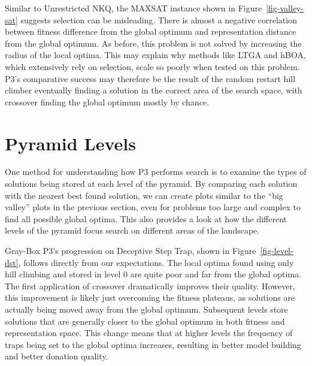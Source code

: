 Similar to Unrestricted NKQ, the MAXSAT instance shown in Figure~\ref{fig-valley-sat} suggests selection can be misleading.
There is almost a negative correlation between fitness difference from the global optimum and representation distance from the
global optimum. As before, this problem is not solved by increasing the radius of the local optima.
This may explain why methods like LTGA and hBOA, which extensively rely on selection,
scale so poorly when tested on this problem. P3's comparative success may therefore be the result of the random restart hill climber
eventually finding a solution in the correct area of the search space, with crossover finding the global optimum mostly by chance.

\section{Pyramid Levels}
One method for understanding how P3 performs search is to examine the types of solutions being stored at each level
of the pyramid. By comparing each solution with the nearest best found solution, we can create plots similar to the ``big valley''
plots 
in the previous section, even for problems too large and complex to find all possible global optima. 
This also provides a look at how the different levels of the pyramid focus search on different areas of the landscape.

\begin{figure*}
  \centering
  \caption{Distribution of local optima stored at each level of Gray-Box P3 in relation to the global optimum on
           the Deceptive Step Trap problem $N=6000$ and traps of size 5.}
  \label{fig-level-dst}
\end{figure*}

Gray-Box P3's progression on Deceptive Step Trap, shown in Figure~\ref{fig-level-dst}, follows directly from our expectations.
The local optima found using only hill climbing and stored in level 0 are quite poor and far from the global optima.
The first application of crossover dramatically improves their quality. However, this improvement is likely just overcoming
the fitness plateaus, as solutions are actually being moved away from the global optimum. Subsequent levels store solutions
that are generally closer to the global optimum in both fitness and representation space. This change means that at higher
levels the frequency of traps being set to the global optima increases, resulting in better model building and better donation quality.


